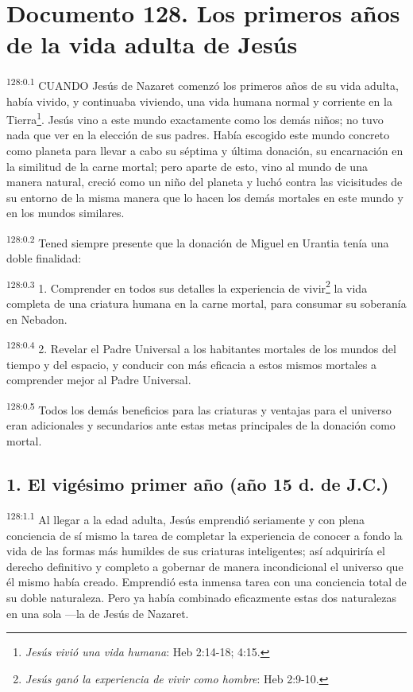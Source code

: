 \chapter{Documento 128. Los primeros años de la vida adulta de Jesús}
\par
\textsuperscript{128:0.1} CUANDO Jesús de Nazaret comenzó los primeros años de su vida adulta, había vivido, y continuaba viviendo, una vida humana normal y corriente en la Tierra\footnote{\textit{Jesús vivió una vida humana}: Heb 2:14-18; 4:15.}. Jesús vino a este mundo exactamente como los demás niños; no tuvo nada que ver en la elección de sus padres. Había escogido este mundo concreto como planeta para llevar a cabo su séptima y última donación, su encarnación en la similitud de la carne mortal; pero aparte de esto, vino al mundo de una manera natural, creció como un niño del planeta y luchó contra las vicisitudes de su entorno de la misma manera que lo hacen los demás mortales en este mundo y en los mundos similares.

\par
\textsuperscript{128:0.2} Tened siempre presente que la donación de Miguel en Urantia tenía una doble finalidad:

\par
\textsuperscript{128:0.3} 1. Comprender en todos sus detalles la experiencia de vivir\footnote{\textit{Jesús ganó la experiencia de vivir como hombre}: Heb 2:9-10.} la vida completa de una criatura humana en la carne mortal, para consumar su soberanía en Nebadon.

\par
\textsuperscript{128:0.4} 2. Revelar el Padre Universal a los habitantes mortales de los mundos del tiempo y del espacio, y conducir con más eficacia a estos mismos mortales a comprender mejor al Padre Universal.

\par
\textsuperscript{128:0.5} Todos los demás beneficios para las criaturas y ventajas para el universo eran adicionales y secundarios ante estas metas principales de la donación como mortal.

\section*{1. El vigésimo primer año (año 15 d. de J.C.)}
\par
\textsuperscript{128:1.1} Al llegar a la edad adulta, Jesús emprendió seriamente y con plena conciencia de sí mismo la tarea de completar la experiencia de conocer a fondo la vida de las formas más humildes de sus criaturas inteligentes; así adquiriría el derecho definitivo y completo a gobernar de manera incondicional el universo que él mismo había creado. Emprendió esta inmensa tarea con una conciencia total de su doble naturaleza. Pero ya había combinado eficazmente estas dos naturalezas en una sola ---la de Jesús de Nazaret.

